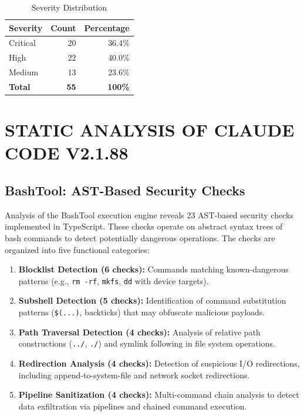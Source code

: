 \documentclass[10pt,conference]{IEEEtran}
\begin{document}
\begin{table}[htbp]
\caption{Severity Distribution}
\label{tab:severity}
\centering
\begin{tabular}{lrr}
\toprule
\textbf{Severity} & \textbf{Count} & \textbf{Percentage} \\
\midrule
Critical & 20 & 36.4\% \\
High & 22 & 40.0\% \\
Medium & 13 & 23.6\% \\
\midrule
\textbf{Total} & \textbf{55} & \textbf{100\%} \\
\bottomrule
\end{tabular}
\end{table}

\section{STATIC ANALYSIS OF CLAUDE CODE V2.1.88}
\label{sec:static-analysis}

\subsection{BashTool: AST-Based Security Checks}
\label{subsec:bashtool}

Analysis of the BashTool execution engine reveals 23 AST-based security checks implemented in TypeScript. These checks operate on abstract syntax trees of bash commands to detect potentially dangerous operations. The checks are organized into five functional categories:

\begin{enumerate}
    \item \textbf{Blocklist Detection (6 checks):} Commands matching known-dangerous patterns (e.g., \texttt{rm -rf}, \texttt{mkfs}, \texttt{dd} with device targets).
    \item \textbf{Subshell Detection (5 checks):} Identification of command substitution patterns (\texttt{\$(...)}, backticks) that may obfuscate malicious payloads.
    \item \textbf{Path Traversal Detection (4 checks):} Analysis of relative path constructions (\texttt{../}, \texttt{./}) and symlink following in file system operations.
    \item \textbf{Redirection Analysis (4 checks):} Detection of suspicious I/O redirections, including append-to-system-file and network socket redirections.
    \item \textbf{Pipeline Sanitization (4 checks):} Multi-command chain analysis to detect data exfiltration via pipelines and chained command execution.
\end{enumerate}
\end{document}
